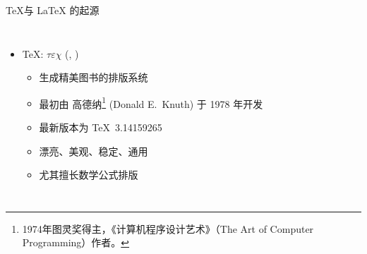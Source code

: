 \begin{frame}[fragile]{\TeX 与 \LaTeX{} 的起源}
  \begin{columns}[T]
    \begin{itemize}
      \item \TeX: $\tau\varepsilon\chi$ (,
        )
        \begin{itemize}
          \item 生成精美图书的排版系统
          \item 最初由 高德纳\footnote{1974年图灵奖得主，《计算机程序设计艺术》（The Art of Computer Programming）作者。} (Donald E.~Knuth) 于 1978 年开发  
          \item 最新版本为 \TeX\ 3.14159265
          \item 漂亮、美观、稳定、通用
          \item 尤其擅长数学公式排版
        \end{itemize}


\end{itemize}
\end{columns}
\end{frame}
